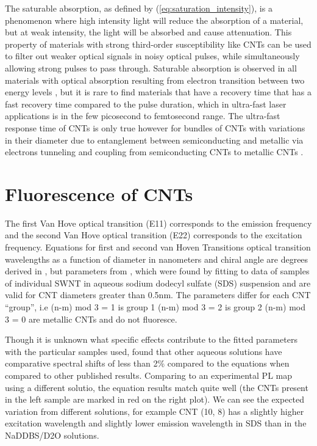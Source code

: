 The saturable absorption, as defined by (\ref{eq:saturation_intensity}), is a phenomenon where high intensity light will reduce the absorption of a material, but at weak intensity, the light will be absorbed and cause attenuation. This property of materials with strong third-order susceptibility like CNTs can be used to filter out weaker optical signals in noisy optical pulses, while simultaneously allowing strong pulses to pass through. Saturable absorption is observed in all materials with optical absorption resulting from electron transition between two energy levels \cite{thomsen}, but it is rare to find materials that have a recovery time that has a fast recovery time compared to the pulse duration, which in ultra-fast laser applications is in the few picosecond to femtosecond range. The ultra-fast response time of CNTs  is only true however for bundles of CNTs with variations in their diameter due to entanglement between semiconducting and metallic via electrons tunneling and coupling from semiconducting CNTs to metallic CNTs \cite{gambetta}.

\section{Fluorescence of CNTs}
The first Van Hove optical transition (E11)
corresponds to the emission frequency and the
second Van Hove optical transition (E22) corresponds
to the excitation frequency. Equations for first and second van Hoven Transitions optical transition wavelengths as a function of diameter in
nanometers and chiral angle are degrees derived in \cite{bachilo}, but  parameters from \cite{weisman}, which were found by fitting
to data of samples of individual SWNT in aqueous sodium dodecyl sulfate (SDS) suspension and are valid for
CNT diameters greater than 0.5nm.
The parameters differ for each CNT “group”, i.e  (n-m) mod 3 = 1 is group 1
(n-m) mod 3 = 2 is group 2
(n-m) mod 3 = 0 are metallic CNTs and do not fluoresce.

Though it is unknown what specific effects contribute to the fitted parameters with the particular samples used, \cite{weisman}found that other
aqueous solutions have comparative spectral shifts of less than 2\% compared to the equations when compared to other published
results. Comparing to an experimental PL map using a different solutio\cite{giordani}, the equation results match quite well (the CNTs present in
the left sample are marked in red on the right plot). We can see the expected variation from different solutions, for example CNT (10,
8) has a slightly higher excitation wavelength and slightly lower emission wavelength in SDS than in the NaDDBS/D2O solutions.

